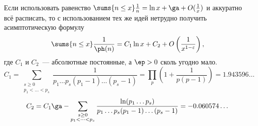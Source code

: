 \documentclass{article}
\begin{document}
\begin{note} Если использовать равенство $\sums{n\le x}\frac1n=\ln x+\ga+O(\frac1x)$ и
аккуратно всё расписать, то с использованием тех же идей нетрудно получить асимптотическую
формулу
$$
\sums{n\le x}\frac1{\ph(n)} = C_1\ln x+C_2+O\left(\frac1{x^{1-\varepsilon}}\right),
$$
где $C_1$ и $C_2$~--- абсолютные постоянные, а $\ep>0$ сколь угодно мало.
$$
C_1=\sum_{\substack{s\ge0\\p_1<\dots<p_s}}\frac1{p_1\dots p_s(p_1-1)\dots(p_s-1)}=
\prod_p\left(1+\frac1{p(p-1)}\right)=1.943596\dots
$$
$$
C_2=C_1\ga-\sum_{\substack{s\ge0\\p_1<\dots<p_s}}\frac{\ln(p_1\dots p_s)}{p_1\dots p_s
(p_1-1)\dots(p_s-1)}=-0.060574\dots
$$
\end{note}
\end{document}

